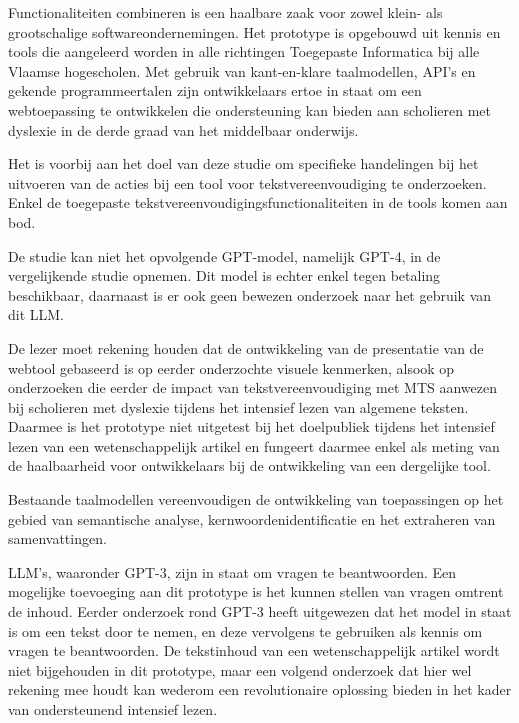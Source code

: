 Functionaliteiten combineren is een haalbare zaak voor zowel klein- als grootschalige softwareondernemingen. Het prototype is opgebouwd uit kennis en tools die aangeleerd worden in alle richtingen Toegepaste Informatica bij alle Vlaamse hogescholen. Met gebruik van kant-en-klare taalmodellen, API's en gekende programmeertalen zijn ontwikkelaars ertoe in staat om een webtoepassing te ontwikkelen die ondersteuning kan bieden aan scholieren met dyslexie in de derde graad van het middelbaar onderwijs. 















Het is voorbij aan het doel van deze studie om specifieke handelingen bij het uitvoeren van de acties bij een tool voor tekstvereenvoudiging te onderzoeken. Enkel de toegepaste tekstvereenvoudigingsfunctionaliteiten in de tools komen aan bod. 

De studie kan niet het opvolgende GPT-model, namelijk GPT-4, in de vergelijkende studie opnemen. Dit model is echter enkel tegen betaling beschikbaar, daarnaast is er ook geen bewezen onderzoek naar het gebruik van dit LLM.

De lezer moet rekening houden dat de ontwikkeling van de presentatie van de webtool gebaseerd is op eerder onderzochte visuele kenmerken, alsook op onderzoeken die eerder de impact van tekstvereenvoudiging met MTS aanwezen bij scholieren met dyslexie tijdens het intensief lezen van algemene teksten. Daarmee is het prototype niet uitgetest bij het doelpubliek tijdens het intensief lezen van een wetenschappelijk artikel en fungeert daarmee enkel als meting van de haalbaarheid voor ontwikkelaars bij de ontwikkeling van een dergelijke tool.







Bestaande taalmodellen vereenvoudigen de ontwikkeling van toepassingen op het gebied van semantische analyse, kernwoordenidentificatie en het extraheren van samenvattingen. 

LLM's, waaronder GPT-3, zijn in staat om vragen te beantwoorden. Een mogelijke toevoeging aan dit prototype is het kunnen stellen van vragen omtrent de inhoud. Eerder onderzoek rond GPT-3 heeft uitgewezen dat het model in staat is om een tekst door te nemen, en deze vervolgens te gebruiken als kennis om vragen te beantwoorden. De tekstinhoud van een wetenschappelijk artikel wordt niet bijgehouden in dit prototype, maar een volgend onderzoek dat hier wel rekening mee houdt kan wederom een revolutionaire oplossing bieden in het kader van ondersteunend intensief lezen. 

